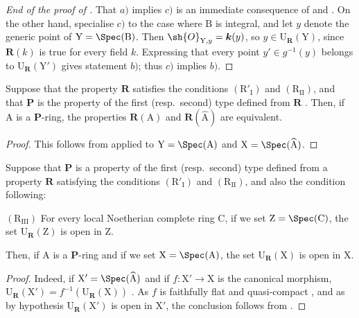 \begin{proof}[End of the proof of ]
That $a)$ implies $c)$ is an immediate consequence of  and .
On the other hand, specialise $c)$ to the case where $\mathrm{B}$ is integral, and let $y$ denote the generic point of $\mathrm{Y}=\Spec(\mathrm{B})$.
Then $\sh{O}_{\mathrm{Y},y}=\boldsymbol{k}(y)$, so $y\in\mathrm{U}_{\boldsymbol{R}}(\mathrm{Y})$, since $\boldsymbol{R}(k)$ is true for every field $k$.
Expressing that every point $y'\in g^{-1}(y)$ belongs to $\mathrm{U}_{\boldsymbol{R}}(\mathrm{Y}')$ gives statement $b)$; thus $c)$ implies $b)$.
\end{proof}

\begin{proposition}[7.3.17]
\label{IV.7.3.17}
Suppose that the property $\boldsymbol{R}$ satisfies the conditions $(\mathrm{R}'_\mathrm{I})$ and $(\mathrm{R_{II}})$, and that $\boldsymbol{P}$ is the property of the first (resp.~second) type defined from $\boldsymbol{R}$ .
Then, if $\mathrm{A}$ is a $\boldsymbol{P}$-ring, the properties $\boldsymbol{R}(\mathrm{A})$ and $\boldsymbol{R}(\widehat{\mathrm{A}})$ are equivalent.
\end{proposition}

\begin{proof}
This follows from  applied to $\mathrm{Y}=\Spec(\mathrm{A})$ and $\mathrm{X}=\Spec(\widehat{\mathrm{A}})$.
\end{proof}

\begin{proposition}[7.3.18]
\label{IV.7.3.18}
Suppose that $\boldsymbol{P}$ is a property of the first (resp.~second) type defined from a property $\boldsymbol{R}$ satisfying the conditions $(\mathrm{R}'_\mathrm{I})$ and $(\mathrm{R_{II}})$, and also the condition following:

$(\mathrm{R_{III}})$ For every local Noetherian complete ring $\mathrm{C}$, if we set $\mathrm{Z}=\Spec(\mathrm{C})$, the set $\mathrm{U}_{\boldsymbol{R}}(\mathrm{Z})$  is open in $\mathrm{Z}$.

Then, if $\mathrm{A}$ is a $\boldsymbol{P}$-ring and if we set $\mathrm{X}=\Spec(\mathrm{A})$, the set $\mathrm{U}_{\boldsymbol{R}}(\mathrm{X})$ is open in $\mathrm{X}$.
\end{proposition}

\begin{proof}
Indeed, if $\mathrm{X}'=\Spec(\widehat{\mathrm{A}})$ and if $f:\mathrm{X}'\to\mathrm{X}$ is the canonical morphism, $\mathrm{U}_{\boldsymbol{R}}(\mathrm{X}')=f^{-1}(\mathrm{U}_{\boldsymbol{R}}(\mathrm{X}))$ .
As $f$ is faithfully flat and quasi-compact , and as by hypothesis $\mathrm{U}_{\boldsymbol{R}}(\mathrm{X}')$ is open in $\mathrm{X}'$, the conclusion follows from .
\end{proof}

